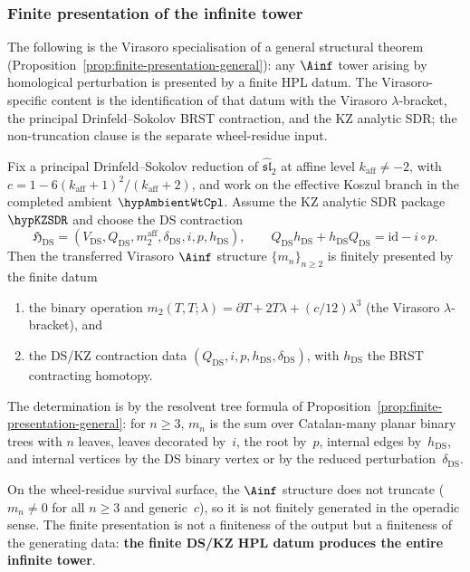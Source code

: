 \subsubsection*{Finite presentation of the infinite tower}

The following is the Virasoro specialisation of a general
structural theorem
(Proposition~\ref{prop:finite-presentation-general}): any
$\Ainf$ tower arising by homological perturbation is presented by a
finite HPL datum. The Virasoro-specific content is the identification
of that datum with the Virasoro $\lambda$-bracket, the principal
Drinfeld--Sokolov BRST contraction, and the KZ analytic SDR; the
non-truncation clause is the separate wheel-residue input.

\begin{theorem}
\label{thm:gravity-finite-presentation}
Fix a principal Drinfeld--Sokolov reduction of
$\widehat{\mathfrak{sl}}_2$ at affine level
$k_{\mathrm{aff}}\ne -2$, with
$c=1-6(k_{\mathrm{aff}}+1)^2/(k_{\mathrm{aff}}+2)$, and work on the
effective Koszul branch in the completed ambient
\(\hypAmbientWtCpl\).  Assume the KZ analytic SDR package
\(\hypKZSDR\) and choose the DS contraction
\[
\mathfrak H_{\mathrm{DS}}
=
(V_{\mathrm{DS}},Q_{\mathrm{DS}},m_2^{\mathrm{aff}},
\delta_{\mathrm{DS}},i,p,h_{\mathrm{DS}}),
\qquad
Q_{\mathrm{DS}}h_{\mathrm{DS}}+h_{\mathrm{DS}}Q_{\mathrm{DS}}
=\mathrm{id}-i\circ p .
\]
Then the transferred Virasoro $\Ainf$ structure
$\{m_n\}_{n \ge 2}$ is finitely presented by the finite datum
\begin{enumerate}[label=\textup{(\roman*)},nosep]
\item the binary operation $m_2(T,T;\lambda)
 = \partial T + 2T\lambda + (c/12)\lambda^3$
 \textup{(}the Virasoro $\lambda$-bracket\textup{)}, and
\item the DS/KZ contraction data $(Q_{\mathrm{DS}},i,p,h_{\mathrm{DS}},
 \delta_{\mathrm{DS}})$, with $h_{\mathrm{DS}}$ the BRST contracting
 homotopy.
\end{enumerate}
The determination is by the resolvent tree formula of
Proposition~\ref{prop:finite-presentation-general}:
for $n\ge3$, $m_n$ is the sum over Catalan-many planar binary trees
with $n$ leaves, leaves decorated by~$i$, the root by~$p$, internal
edges by~$h_{\mathrm{DS}}$, and internal vertices by the DS binary
vertex or by the reduced perturbation~$\delta_{\mathrm{DS}}$.

On the wheel-residue survival surface, the $\Ainf$ structure does not
truncate ($m_n \ne 0$ for all $n \ge 3$ and generic~$c$), so it is not
finitely generated in the operadic sense. The finite presentation is not a finiteness
of the output but a finiteness of the generating data:
\textbf{the finite DS/KZ HPL datum produces the entire infinite tower}.
\end{theorem}

